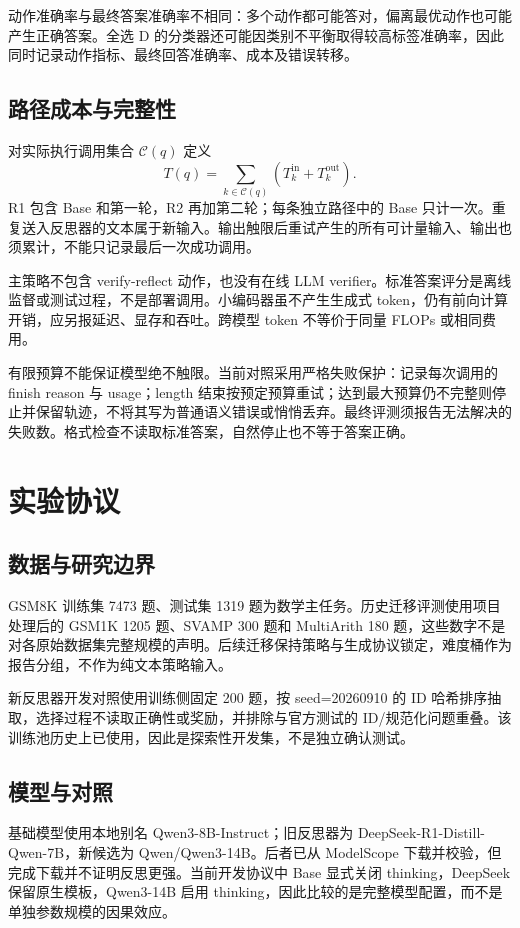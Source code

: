 \documentclass[11pt]{article}
\begin{document}
动作准确率与最终答案准确率不相同：多个动作都可能答对，偏离最优动作也可能产生正确答案。全选 D 的分类器还可能因类别不平衡取得较高标签准确率，因此同时记录动作指标、最终回答准确率、成本及错误转移。

\subsection{路径成本与完整性}
对实际执行调用集合 $\mathcal C(q)$ 定义
\begin{equation}
T(q)=\sum_{k\in\mathcal C(q)}(T_k^{\mathrm{in}}+T_k^{\mathrm{out}}).
\label{eq:cost}
\end{equation}
R1 包含 Base 和第一轮，R2 再加第二轮；每条独立路径中的 Base 只计一次。重复送入反思器的文本属于新输入。输出触限后重试产生的所有可计量输入、输出也须累计，不能只记录最后一次成功调用。

主策略不包含 verify-reflect 动作，也没有在线 LLM verifier。标准答案评分是离线监督或测试过程，不是部署调用。小编码器虽不产生生成式 token，仍有前向计算开销，应另报延迟、显存和吞吐。跨模型 token 不等价于同量 FLOPs 或相同费用。

有限预算不能保证模型绝不触限。当前对照采用严格失败保护：记录每次调用的 finish reason 与 usage；length 结束按预定预算重试；达到最大预算仍不完整则停止并保留轨迹，不将其写为普通语义错误或悄悄丢弃。最终评测须报告无法解决的失败数。格式检查不读取标准答案，自然停止也不等于答案正确。

\section{实验协议}
\subsection{数据与研究边界}
GSM8K 训练集 7473 题、测试集 1319 题为数学主任务。历史迁移评测使用项目处理后的 GSM1K 1205 题、SVAMP 300 题和 MultiArith 180 题，这些数字不是对各原始数据集完整规模的声明。后续迁移保持策略与生成协议锁定，难度桶作为报告分组，不作为纯文本策略输入。

新反思器开发对照使用训练侧固定 200 题，按 seed=20260910 的 ID 哈希排序抽取，选择过程不读取正确性或奖励，并排除与官方测试的 ID/规范化问题重叠。该训练池历史上已使用，因此是探索性开发集，不是独立确认测试。

\subsection{模型与对照}
基础模型使用本地别名 Qwen3-8B-Instruct；旧反思器为 DeepSeek-R1-Distill-Qwen-7B，新候选为 Qwen/Qwen3-14B。后者已从 ModelScope 下载并校验，但完成下载并不证明反思更强。当前开发协议中 Base 显式关闭 thinking，DeepSeek 保留原生模板，Qwen3-14B 启用 thinking，因此比较的是完整模型配置，而不是单独参数规模的因果效应。
\end{document}
